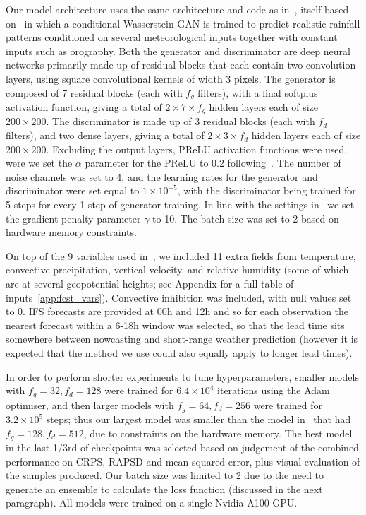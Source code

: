 \documentclass{article}
\begin{document}
Our model architecture uses the same architecture and code as in~\cite{harris_generative_2022}, itself based on~\cite{leinonen_stochastic_2020} in which a conditional Wasserstein GAN is trained to predict realistic rainfall patterns conditioned on several meteorological inputs together with constant inputs such as orography. Both the generator and discriminator are deep neural networks primarily made up of residual blocks that each contain two convolution layers, using square convolutional kernels of width 3 pixels. The generator is composed of 7 residual blocks (each with $f_g$ filters), with a final softplus activation function, giving a total of $2 \times 7 \times f_g$ hidden layers each of size $200 \times 200$. The discriminator is made up of 3 residual blocks (each with $f_d$ filters), and two dense layers, giving a total of $2 \times 3 \times f_d$ hidden layers each of size $200 \times 200$. 
Excluding the output layers, PReLU activation functions were used, were we set the $\alpha$ parameter for the PReLU to 0.2 following~\cite{harris_generative_2022}. The number of noise channels was set to 4, and the learning rates for the generator and discriminator were set equal to $1\times 10^{-5}$, with the discriminator being trained for 5 steps for every 1 step of generator training. In line with the settings in~\cite{gulrajani_improved_2017} we set the gradient penalty parameter $\gamma$ to 10. The batch size was set to 2 based on hardware memory constraints.

 On top of the 9 variables used in~\cite{harris_generative_2022}, we included 11 extra fields from temperature, convective precipitation, vertical velocity, and relative humidity (some of which are at several geopotential heights; see Appendix for a full table of inputs~\ref{app:fcst_vars}). Convective inhibition was included, with null values set to 0. IFS forecasts are provided at 00h and 12h and so for each observation the nearest forecast within a 6-18h window was selected, so that the lead time sits somewhere between nowcasting and short-range weather prediction (however it is expected that the method we use could also equally apply to longer lead times).

 In order to perform shorter experiments to tune hyperparameters, smaller models with $f_g=32, f_d=128$ were trained for $6.4\times 10^4$ iterations using the Adam optimiser, and then larger models with $f_g=64, f_d=256$ were trained for $3.2\times10^5$ steps; thus our largest model was smaller than the model in~\cite{harris_generative_2022} that had $f_g=128, f_d=512$, due to constraints on the hardware memory. The best model in the last 1/3rd of checkpoints was selected based on judgement of the combined performance on CRPS, RAPSD and mean squared error, plus visual evaluation of the samples produced. Our batch size was limited to 2 due to the need to generate an ensemble to calculate the loss function (discussed in the next paragraph). All models were trained on a single Nvidia A100 GPU.
\end{document}
